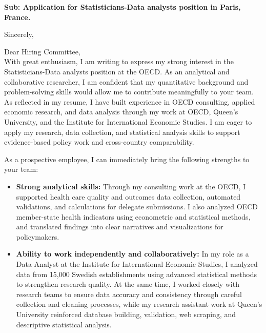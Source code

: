 \documentclass[11pt,a4paper,roman]{moderncv}
\begin{document}
\date{\today}
\opening{\textbf{Sub: Application for Statisticians-Data analysts position in Paris, France.}}
\closing{Sincerely, \vspace{-1em}}


\makelettertitle



Dear Hiring Committee,
\\
\vspace{1em}
With great enthusiasm, I am writing to express my strong interest in the Statisticians-Data analysts position at the OECD. As an analytical and collaborative researcher, I am confident that my quantitative background and problem-solving skills would allow me to contribute meaningfully to your team.\\

\vspace{1em}
As reflected in my resume, I have built experience in OECD consulting, applied economic research, and data analysis through my work at OECD, Queen's University, and the Institute for International Economic Studies. I am eager to apply my research, data collection, and statistical analysis skills to support evidence-based policy work and cross-country comparability.\\
\vspace{1em}

As a prospective employee, I can immediately bring the following strengths to your team:
\vspace{0.5em}
\begin{itemize}
\item \textbf{Strong analytical skills:} Through my consulting work at the OECD, I supported health care quality and outcomes data collection, automated validations, and calculations for delegate submissions. I also analyzed OECD member-state health indicators using econometric and statistical methods, and translated findings into clear narratives and visualizations for policymakers.
\item \textbf{Ability to work independently and collaboratively:} In my role as a Data Analyst at the Institute for International Economic Studies, I analyzed data from 15,000 Swedish establishments using advanced statistical methods to strengthen research quality. At the same time, I worked closely with research teams to ensure data accuracy and consistency through careful collection and cleaning processes, while my research assistant work at Queen's University reinforced database building, validation, web scraping, and descriptive statistical analysis.
\end{itemize}
\end{document}
